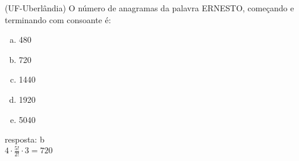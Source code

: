 \begin{ex}
 	(UF-Uberlândia) O número de anagramas da palavra ERNESTO, começando e terminando com consoante é:
    \begin{enumerate}[(a)]
    \item 480
    \item 720
    \item 1440
    \item 1920
    \item 5040
    \end{enumerate}
      \begin{sol}
        resposta: b \\
        $4\cdot\frac{5!}{2!}\cdot3=720$
      \end{sol}
\end{ex}